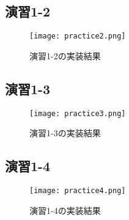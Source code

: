 \documentclass[12pt]{jarticle}
\begin{document}
\subsection{演習1-2}
\begin{figure}[H]
 \centering
 \texttt{[image: practice2.png]}
 \caption{演習1-2の実装結果}
\end{figure}
\subsection{演習1-3}
\begin{figure}[H]
 \centering
 \texttt{[image: practice3.png]}
 \caption{演習1-3の実装結果}
\end{figure}

\subsection{演習1-4}
\begin{figure}[H]
 \centering
 \texttt{[image: practice4.png]}
 \caption{演習1-4の実装結果}
\end{figure}
\end{document}
